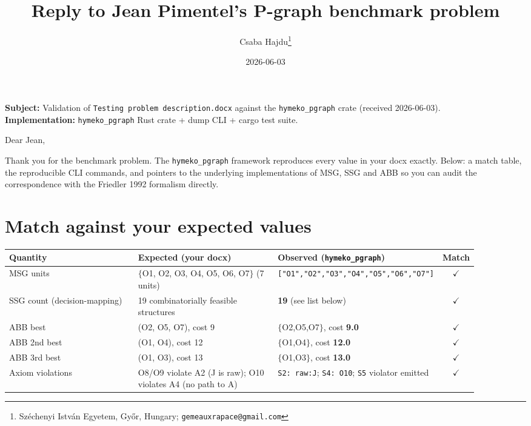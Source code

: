 \documentclass[11pt]{article}
\title{%
  Reply to Jean Pimentel's P-graph benchmark problem%
}
\author{%
  Csaba Hajdu\thanks{Sz\'echenyi Istv\'an Egyetem, Gy\H{o}r, Hungary; \texttt{gemeauxrapace@gmail.com}}%
}
\date{2026-06-03}
\begin{document}
\maketitle

\noindent\textbf{Subject:} Validation of \texttt{Testing problem description.docx} against the \texttt{hymeko\_pgraph} crate (received 2026-06-03).\\
\textbf{Implementation:} \texttt{hymeko\_pgraph} Rust crate + dump CLI + cargo test suite.

\vspace{0.5em}

Dear Jean,

Thank you for the benchmark problem. The \texttt{hymeko\_pgraph} framework
reproduces every value in your docx exactly. Below: a match table, the
reproducible CLI commands, and pointers to the underlying
implementations of MSG, SSG and ABB so you can audit the
correspondence with the Friedler 1992 formalism directly.

\section*{Match against your expected values}

\begin{table}[h]
\centering
\small
\begin{tabular}{p{0.30\linewidth}p{0.32\linewidth}p{0.28\linewidth}c}
\toprule
Quantity & Expected (your docx) & Observed (\texttt{hymeko\_pgraph}) & Match \\
\midrule
MSG units & $\{$O1, O2, O3, O4, O5, O6, O7$\}$ (7 units) & \texttt{["O1","O2","O3","O4","O5","O6","O7"]} & $\checkmark$ \\
SSG count (decision-mapping) & 19 combinatorially feasible structures & \textbf{19} (see list below) & $\checkmark$ \\
ABB best & (O2, O5, O7), cost 9 & $\{$O2,O5,O7$\}$, cost \textbf{9.0} & $\checkmark$ \\
ABB 2nd best & (O1, O4), cost 12 & $\{$O1,O4$\}$, cost \textbf{12.0} & $\checkmark$ \\
ABB 3rd best & (O1, O3), cost 13 & $\{$O1,O3$\}$, cost \textbf{13.0} & $\checkmark$ \\
Axiom violations & O8/O9 violate A2 (J is raw); O10 violates A4 (no path to A) & \texttt{S2: raw:J}; \texttt{S4: O10}; \texttt{S5} violator emitted & $\checkmark$ \\
\bottomrule
\end{tabular}
\end{table}
\end{document}
